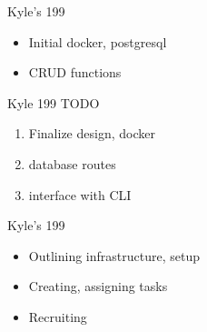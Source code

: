 
\begin{frame}{Kyle's 199}
    \begin{itemize}
        \item Initial docker, postgresql
        \item CRUD functions
    \end{itemize}    
\end{frame}

\begin{frame}{Kyle 199 TODO}
    \begin{enumerate}
        \item Finalize design, docker
        \item database routes
        \item interface with CLI
    \end{enumerate}
\end{frame}

\begin{frame}{Kyle's 199}
    \begin{itemize}
        \item Outlining infrastructure, setup
        \item Creating, assigning tasks
        \item Recruiting
    \end{itemize}    
\end{frame}


